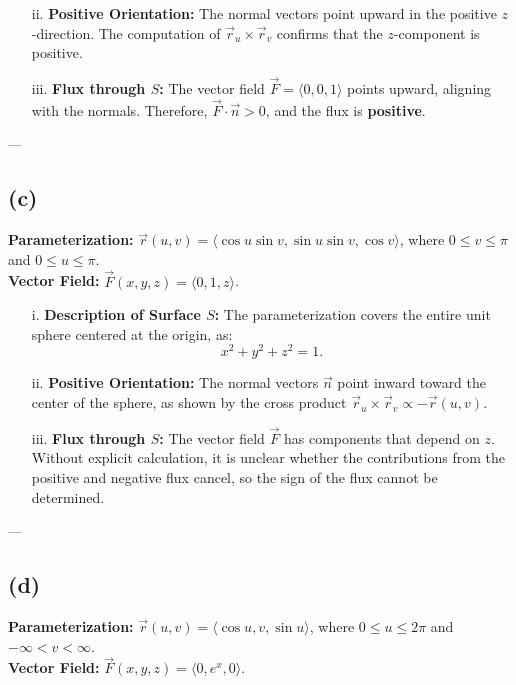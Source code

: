 \documentclass{report}
\begin{document}
{\begin{enumerate}
        \item[ii.] \textbf{Positive Orientation:} The normal vectors point upward in the positive \(z\)-direction. The computation of \(\vec{r}_u \times \vec{r}_v\) confirms that the \(z\)-component is positive.

        \item[iii.] \textbf{Flux through \(S\):} The vector field \(\vec{F} = \langle 0, 0, 1 \rangle\) points upward, aligning with the normals. Therefore, \(\vec{F} \cdot \vec{n} > 0\), and the flux is \textbf{positive}.
    \end{enumerate}

    ---

    \subsection*{(c)}

    \textbf{Parameterization:} \(\vec{r}(u, v) = \langle \cos u \sin v, \sin u \sin v, \cos v \rangle\), where \(0 \leq v \leq \pi\) and \(0 \leq u \leq \pi\). \\
    \textbf{Vector Field:} \(\vec{F}(x, y, z) = \langle 0, 1, z \rangle\).

    \begin{enumerate}
        \item[i.] \textbf{Description of Surface \(S\):} The parameterization covers the entire unit sphere centered at the origin, as:
        \[
        x^2 + y^2 + z^2 = 1.
        \]

        \item[ii.] \textbf{Positive Orientation:} The normal vectors \(\vec{n}\) point inward toward the center of the sphere, as shown by the cross product \(\vec{r}_u \times \vec{r}_v \propto -\vec{r}(u, v)\).

        \item[iii.] \textbf{Flux through \(S\):} The vector field \(\vec{F}\) has components that depend on \(z\). Without explicit calculation, it is unclear whether the contributions from the positive and negative flux cancel, so the sign of the flux cannot be determined.
    \end{enumerate}

    ---

    \subsection*{(d)}

    \textbf{Parameterization:} \(\vec{r}(u, v) = \langle \cos u, v, \sin u \rangle\), where \(0 \leq u \leq 2\pi\) and \(-\infty < v < \infty\). \\
    \textbf{Vector Field:} \(\vec{F}(x, y, z) = \langle 0, e^x, 0 \rangle\).

}
\end{document}
